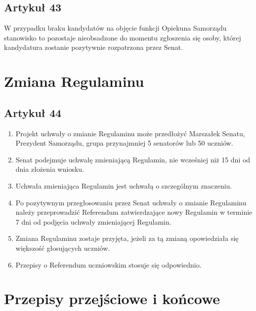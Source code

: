 \documentclass[14pt]{article}
\newenvironment{ustepy}{%
	\begin{enumerate}[leftmargin=1.5em, itemindent=1pt, labelwidth=1em, itemsep=5pt]
	}{%
	\end{enumerate}
}
\begin{document}
\subsection*{Artykuł 43}
W przypadku braku kandydatów na objęcie funkcji Opiekuna Samorządu stanowisko to pozostaje nieobsadzone do momentu zgłoszenia się osoby, której kandydatura zostanie pozytywnie rozpatrzona przez Senat.
\newpage
\section{Zmiana Regulaminu}
\subsection*{Artykuł 44}
\begin{ustepy}
	\item Projekt uchwały o zmianie Regulaminu może przedłożyć Marszałek Senatu, Prezydent Samorządu, grupa przynajmniej 5 senatorów lub 50 uczniów.
	\item Senat podejmuje uchwałę zmieniającą Regulamin, nie wcześniej niż 15 dni od dnia złożenia wniosku.
	\item Uchwała zmieniająca Regulamin jest uchwałą o szczególnym znaczeniu.
	\item Po pozytywnym przegłosowaniu przez Senat uchwały o zmianie Regulaminu należy przeprowadzić Referendum zatwierdzające nowy Regulamin w terminie 7 dni od podjęcia uchwały zmieniającej Regulamin.
	\item Zmiana Regulaminu zostaje przyjęta, jeżeli za tą zmianą opowiedziała się większość głosujących uczniów.
	\item Przepisy o Referendum uczniowskim stosuje się odpowiednio.
\end{ustepy}
\section{Przepisy przejściowe i końcowe}
\end{document}
